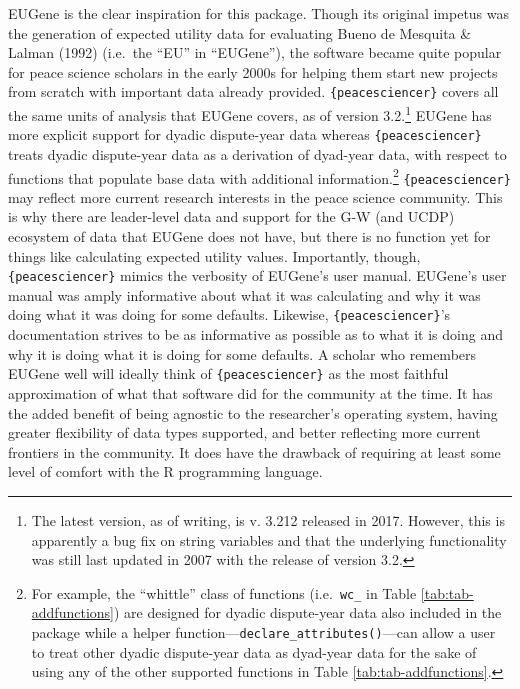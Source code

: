 \documentclass[
  11pt,
]{article}
\begin{document}
EUGene is the clear inspiration for this package. Though its original impetus was the generation of expected utility data for evaluating Bueno de Mesquita \& Lalman (1992) (i.e.~the ``EU'' in ``EUGene''), the software became quite popular for peace science scholars in the early 2000s for helping them start new projects from scratch with important data already provided. \texttt{\{peacesciencer\}} covers all the same units of analysis that EUGene covers, as of version 3.2.\footnote{The latest version, as of writing, is v. 3.212 released in 2017. However, this is apparently a bug fix on string variables and that the underlying functionality was still last updated in 2007 with the release of version 3.2.} EUGene has more explicit support for dyadic dispute-year data whereas \texttt{\{peacesciencer\}} treats dyadic dispute-year data as a derivation of dyad-year data, with respect to functions that populate base data with additional information.\footnote{For example, the ``whittle'' class of functions (i.e.~\texttt{wc\_} in Table \ref{tab:tab-addfunctions}) are designed for dyadic dispute-year data also included in the package while a helper function---\texttt{declare\_attributes()}---can allow a user to treat other dyadic dispute-year data as dyad-year data for the sake of using any of the other supported functions in Table \ref{tab:tab-addfunctions}.} \texttt{\{peacesciencer\}} may reflect more current research interests in the peace science community. This is why there are leader-level data and support for the G-W (and UCDP) ecosystem of data that EUGene does not have, but there is no function yet for things like calculating expected utility values. Importantly, though, \texttt{\{peacesciencer\}} mimics the verbosity of EUGene's user manual. EUGene's user manual was amply informative about what it was calculating and why it was doing what it was doing for some defaults. Likewise, \texttt{\{peacesciencer\}}'s documentation strives to be as informative as possible as to what it is doing and why it is doing what it is doing for some defaults. A scholar who remembers EUGene well will ideally think of \texttt{\{peacesciencer\}} as the most faithful approximation of what that software did for the community at the time. It has the added benefit of being agnostic to the researcher's operating system, having greater flexibility of data types supported, and better reflecting more current frontiers in the community. It does have the drawback of requiring at least some level of comfort with the R programming language.
\end{document}
